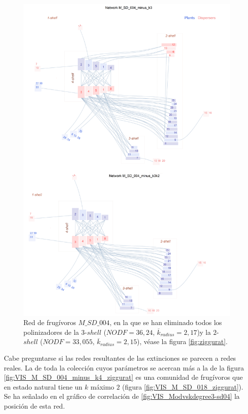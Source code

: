 \clearpage
\begin{figure}[ht!]
\centering
\includegraphics[scale=0.5]{Figures/VIS_M_SD_004_minus_k3k2_ziggurat.png}
\caption {Red de frugívoros $M\_SD\_004$, en la que se han eliminado todos los polinizadores de la $3$-$shell$ ($NODF = 36,24$, $\overline k_{radius} = 2,17$)y la $2$-$shell$ ($NODF = 33,055$, $\overline k_{radius} = 2,15$), véase la figura \ref{fig:ziggurat}.} 
\label{fig:VIS_M_SD_004_minus_k3k2_ziggurat}
\end{figure}

\clearpage
Cabe preguntarse si las redes resultantes de las extinciones se parecen a redes reales. La de toda la colección cuyos parámetros se acercan más a la de la figura \ref{fig:VIS_M_SD_004_minus_k4_ziggurat} es una comunidad de frugívoros que en estado natural tiene un $k$ máximo $2$ (figura \ref{fig:VIS_M_SD_018_ziggurat}). Se ha señalado en el gráfico de correlación de \ref{fig:VIS_Modvskdegree3-sd04} la posición de esta red.

